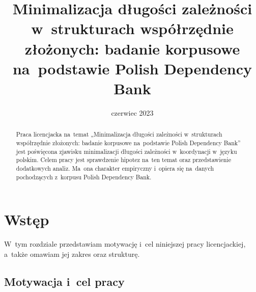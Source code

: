 \documentclass[licencjacka]{pracamgr_Kogni}
\title{Minimalizacja długości zależności w~strukturach współrzędnie złożonych: badanie korpusowe na~podstawie Polish Dependency Bank}
\date{czerwiec 2023}
\begin{document}
\maketitle


\begin{abstract}
Praca licencjacka na~temat „Minimalizacja długości zależności w~strukturach współrzędnie złożonych: badanie korpusowe na~podstawie Polish Dependency Bank” jest poświęcona zjawisku minimalizacji długości zależności w~koordynacji w~języku polskim. Celem pracy jest sprawdzenie hipotez na~ten temat oraz przedstawienie dodatkowych analiz. Ma~ona charakter empiryczny i~opiera się na~danych pochodzących z~korpusu Polish Dependency Bank. 


\end{abstract}

\thispagestyle{empty}
\setcounter{page}{3}
\tableofcontents

\chapter{Wstęp}
W~tym rozdziale przedstawiam motywację i~cel niniejszej pracy licencjackiej, a~także omawiam jej zakres oraz strukturę.

\section{Motywacja i~cel pracy}
\end{document}
